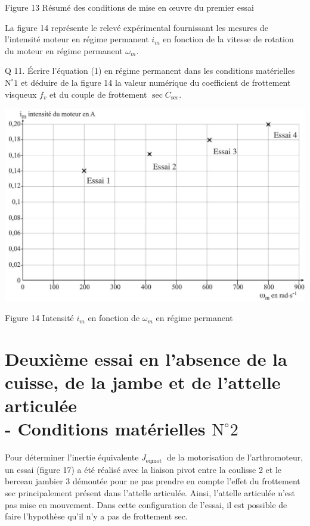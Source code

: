 \documentclass[10pt]{article}
\begin{document}
Figure 13 Résumé des conditions de mise en œuvre du premier essai

La figure 14 représente le relevé expérimental fournissant les mesures de l'intensité moteur en régime permanent $i_{m}$ en fonction de la vitesse de rotation du moteur en régime permanent $\omega_{m}$.

Q 11. Écrire l'équation (1) en régime permanent dans les conditions matérielles $\mathrm{N}^{\circ} 1$ et déduire de la figure 14 la valeur numérique du coefficient de frottement visqueux $f_{v}$ et du couple de frottement $\sec C_{\mathrm{sec}}$.

\begin{center}
\includegraphics[max width=\textwidth]{2024_07_14_a83aebba33898893d39fg-09(1)}
\end{center}

Figure 14 Intensité $i_{m}$ en fonction de $\omega_{m}$ en régime permanent

\section*{Deuxième essai en l'absence de la cuisse, de la jambe et de l'attelle articulée \\
 - Conditions matérielles $\mathrm{N}^{\circ} 2$}
Pour déterminer l'inertie équivalente $J_{\text {eqmot }}$ de la motorisation de l'arthromoteur, un essai (figure 17) a été réalisé avec la liaison pivot entre la coulisse 2 et le berceau jambier 3 démontée pour ne pas prendre en compte l'effet du frottement sec principalement présent dans l'attelle articulée. Ainsi, l'attelle articulée n'est pas mise en mouvement. Dans cette configuration de l'essai, il est possible de faire l'hypothèse qu'il n'y a pas de frottement sec.
\end{document}
